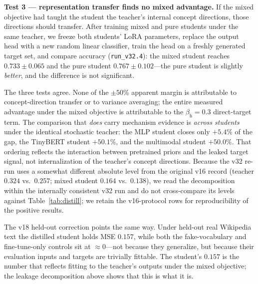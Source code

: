 \documentclass[10pt]{article}
\theoremstyle{definition}
\theoremstyle{plain}
\theoremstyle{remark}
\begin{document}
\textbf{Test 3 --- representation transfer finds no mixed advantage.} If the mixed objective had taught the student the teacher's internal concept directions, those directions should transfer. After training mixed and pure students under the same teacher, we freeze both students' LoRA parameters, replace the output head with a new random linear classifier, train the head on a freshly generated target set, and compare accuracy (\texttt{run\_v32.4}): the mixed student reaches $0.733 \pm 0.065$ and the pure student $0.767 \pm 0.102$---the pure student is slightly \emph{better}, and the difference is not significant.

The three tests agree. None of the $\pm 50\%$ apparent margin is attributable to concept-direction transfer or to variance averaging; the entire measured advantage under the mixed objective is attributable to the $\beta_{\text{h}}=0.3$ direct-target term. The comparison that \emph{does} carry mechanism evidence is \emph{across students} under the identical stochastic teacher: the MLP student closes only $+5.4\%$ of the gap, the TinyBERT student $+50.1\%$, and the multimodal student $+50.0\%$. That ordering reflects the interaction between pretrained priors and the leaked target signal, not internalization of the teacher's concept directions. Because the v32 re-run uses a somewhat different absolute level from the original v16 record (teacher $0.324$ vs.\ $0.257$; mixed student $0.164$ vs.\ $0.138$), we read the decomposition within the internally consistent v32 run and do not cross-compare its levels against Table~\ref{tab:distill}; we retain the v16-protocol rows for reproducibility of the positive results.

The v18 held-out correction points the same way. Under held-out real Wikipedia text the distilled student holds MSE $0.157$, while both the fake-vocabulary and fine-tune-only controls sit at $\approx 0$---not because they generalize, but because their evaluation inputs and targets are trivially fittable. The student's $0.157$ is the number that reflects fitting to the teacher's outputs under the mixed objective; the leakage decomposition above shows that this is what it is.
\end{document}
